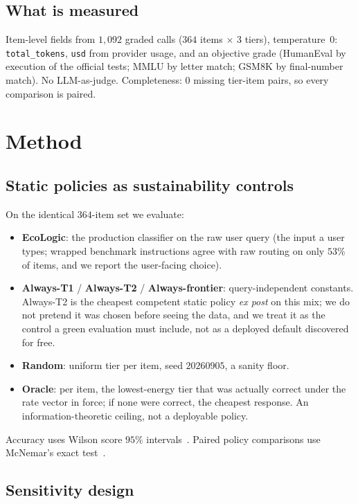 \documentclass[10pt,conference]{IEEEtran}
\begin{document}
\subsection{What is measured}

Item-level fields from $1{,}092$ graded calls ($364$ items $\times$ $3$ tiers), temperature~$0$: \texttt{total\_tokens}, \texttt{usd} from provider usage, and an objective grade (HumanEval by execution of the official tests; MMLU by letter match; GSM8K by final-number match). No LLM-as-judge. Completeness: $0$ missing tier-item pairs, so every comparison is paired.

\section{Method}

\subsection{Static policies as sustainability controls}

On the identical $364$-item set we evaluate:
\begin{itemize}
\item \textbf{EcoLogic}: the production classifier on the raw user query (the input a user types; wrapped benchmark instructions agree with raw routing on only $53\%$ of items, and we report the user-facing choice).
\item \textbf{Always-T1} / \textbf{Always-T2} / \textbf{Always-frontier}: query-independent constants. Always-T2 is the cheapest competent static policy \emph{ex post} on this mix; we do not pretend it was chosen before seeing the data, and we treat it as the control a green evaluation must include, not as a deployed default discovered for free.
\item \textbf{Random}: uniform tier per item, seed $20260905$, a sanity floor.
\item \textbf{Oracle}: per item, the lowest-energy tier that was actually correct under the rate vector in force; if none were correct, the cheapest response. An information-theoretic ceiling, not a deployable policy.
\end{itemize}
Accuracy uses Wilson score $95\%$ intervals~\cite{wilson1927}. Paired policy comparisons use McNemar's exact test~\cite{mcnemar1947}.

\subsection{Sensitivity design}
\end{document}
